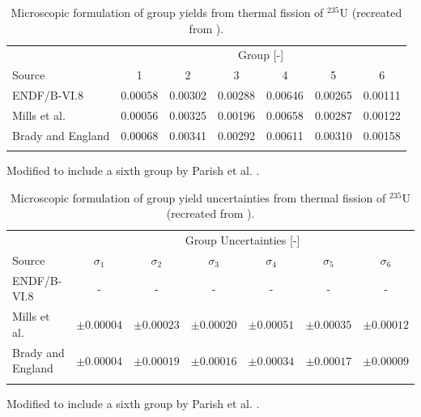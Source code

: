 \begin{table}[!h]
\centering
\begin{threeparttable}
\caption{Microscopic formulation of group yields from thermal fission of $^{235}$U (recreated from \cite{parish1999status}).}
\begin{tabular}{lcccccc}
\hline
 & \multicolumn{6}{c}{Group [-]} \\
Source & 1 & 2 & 3 & 4 & 5 & 6 \\
\hline
ENDF/B-VI.8 \cite{endf6}   & 0.00058 & 0.00302 & 0.00288 & 0.00646 & 0.00265 & 0.00111 \\
Mills et al. \cite{mills1991study}    & 0.00056 & 0.00325 & 0.00196 & 0.00658 & 0.00287 & 0.00122 \\
Brady and England \cite{brady1989delayed} & 0.00068 & 0.00341 & 0.00292 & 0.00611 & 0.00310 & 0.00158 \\
\hline
\label{tab:micro-yields}
\end{tabular}
\begin{tablenotes}
\item[*] Modified to include a sixth group by Parish et al. \cite{parish1999status}.
\end{tablenotes}
\end{threeparttable}
\end{table}

\begin{table}[!h]
\centering
\begin{threeparttable}
\caption{Microscopic formulation of group yield uncertainties from thermal fission of $^{235}$U (recreated from \cite{parish1999status}).}
\begin{tabular}{lcccccc}
\hline
 & \multicolumn{6}{c}{Group Uncertainties [-]} \\
Source & $\sigma_1$ & $\sigma_2$ & $\sigma_3$ & $\sigma_4$ & $\sigma_5$ & $\sigma_6$ \\
\hline
ENDF/B-VI.8 \cite{endf6}   & - & - & - & - & - & - \\
Mills et al. \cite{mills1991study}    & $\pm0.00004$ & $\pm0.00023$ & $\pm0.00020$ & $\pm0.00051$ & $\pm0.00035$ & $\pm0.00012$\\
Brady and England \cite{brady1989delayed} & $\pm0.00004$ & $\pm0.00019$ & $\pm0.00016$ & $\pm0.00034$ & $\pm0.00017$ & $\pm0.00009$ \\
\hline
\label{tab:micro-yield-delta}
\end{tabular}
\begin{tablenotes}
\item[*] Modified to include a sixth group by Parish et al. \cite{parish1999status}.
\end{tablenotes}
\end{threeparttable}
\end{table}

